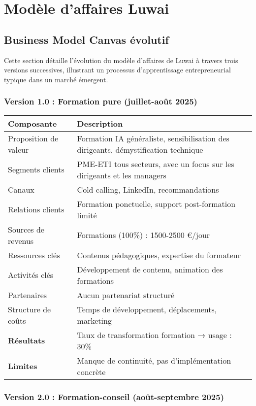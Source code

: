 \chapter{Modèle d'affaires Luwai}
\label{app:luwai}

\section{Business Model Canvas évolutif}

Cette section détaille l'évolution du modèle d'affaires de Luwai à travers trois versions successives, illustrant un processus d'apprentissage entrepreneurial typique dans un marché émergent.

\subsection{Version 1.0 : Formation pure (juillet-août 2025)}

\begin{longtable}{@{}>{\raggedright\arraybackslash}p{4cm}>{\raggedright\arraybackslash}p{10cm}@{}}
\toprule
\textbf{Composante} & \textbf{Description} \\
\midrule
Proposition de valeur & Formation IA généraliste, sensibilisation des dirigeants, démystification technique \\
Segments clients & PME-ETI tous secteurs, avec un focus sur les dirigeants et les managers \\
Canaux & Cold calling, LinkedIn, recommandations \\
Relations clients & Formation ponctuelle, support post-formation limité \\
Sources de revenus & Formations (100\%) : 1500-2500 €/jour \\
Ressources clés & Contenus pédagogiques, expertise du formateur \\
Activités clés & Développement de contenu, animation des formations \\
Partenaires & Aucun partenariat structuré \\
Structure de coûts & Temps de développement, déplacements, marketing \\
\midrule
\textbf{Résultats} & Taux de transformation formation → usage : 30\% \\
\textbf{Limites} & Manque de continuité, pas d'implémentation concrète \\
\bottomrule
\end{longtable}

\subsection{Version 2.0 : Formation-conseil (août-septembre 2025)}

